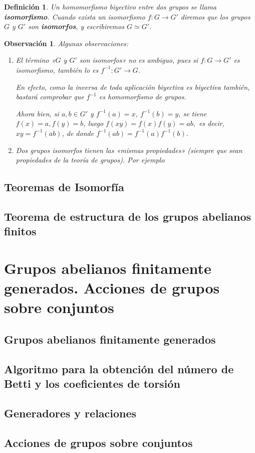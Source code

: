 \documentclass[12pt]{article}
\newtheorem{definition}[theorem]{Definición}
\newtheorem{observation}{Observación}[theorem]
\begin{document}
\begin{definition}Un homomorfismo biyectivo entre dos grupos se llama \textbf{isomorfismo}. Cuando exista un isomorfismo $f \colon G \longrightarrow G'$ diremos que los grupos $G$ y $G'$ son \textbf{isomorfos}, y escribiremos $G \simeq G'$.
\end{definition}

\begin{observation}Algunas observaciones:
\begin{enumerate}
\item El término «$G$ y $G'$ son isomorfos» no es ambiguo, pues si $f \colon G \longrightarrow G'$ es isomorfismo, también lo es $f^{-1}\colon G' \longrightarrow G$. 

En efecto, como la inversa de toda aplicación biyectiva es biyectiva también, bastará comprobar que $f^{-1}$ es homomorfismo de grupos.

Ahora bien, si $a,b \in G'$ y $f^{-1}(a) = x$, $f^{-1}(b) = y$, se tiene $f(x) = a, f(y) = b$, luego $f(xy) = f(x) f(y) = ab,$ es decir, $xy = f^{-1}(ab)$, de donde $f^{-1}(ab) = f^{-1}(a)f^{-1}(b)$.
\item Dos grupos isomorfos tienen las «mismas propiedades» (siempre que sean propiedades de la teoría de grupos). Por ejemplo 
\end{enumerate}
\end{observation}

\subsection{Teoremas de Isomorfía}
\subsection{Teorema de estructura de los grupos abelianos finitos}
\section{Grupos abelianos finitamente generados. Acciones de grupos sobre conjuntos}
\subsection{Grupos abelianos finitamente generados}
\subsection{Algoritmo para la obtención del número de Betti y los coeficientes de torsión}
\subsection{Generadores y relaciones}
\subsection{Acciones de grupos sobre conjuntos}
\end{document}
